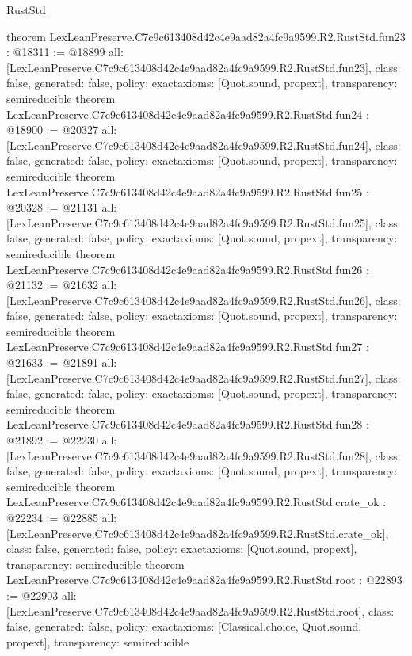 \begin{lexlean}{RustStd}
\begin{coremodule}
{}
theorem LexLeanPreserve.C7c9c613408d42c4e9aad82a4fc9a9599.R2.RustStd.fun23 : @18311 := @18899 {
  all: [LexLeanPreserve.C7c9c613408d42c4e9aad82a4fc9a9599.R2.RustStd.fun23],
  class: false,
  generated: false,
  policy: exact{axioms: [Quot.sound, propext]},
  transparency: semireducible
}
theorem LexLeanPreserve.C7c9c613408d42c4e9aad82a4fc9a9599.R2.RustStd.fun24 : @18900 := @20327 {
  all: [LexLeanPreserve.C7c9c613408d42c4e9aad82a4fc9a9599.R2.RustStd.fun24],
  class: false,
  generated: false,
  policy: exact{axioms: [Quot.sound, propext]},
  transparency: semireducible
}
theorem LexLeanPreserve.C7c9c613408d42c4e9aad82a4fc9a9599.R2.RustStd.fun25 : @20328 := @21131 {
  all: [LexLeanPreserve.C7c9c613408d42c4e9aad82a4fc9a9599.R2.RustStd.fun25],
  class: false,
  generated: false,
  policy: exact{axioms: [Quot.sound, propext]},
  transparency: semireducible
}
theorem LexLeanPreserve.C7c9c613408d42c4e9aad82a4fc9a9599.R2.RustStd.fun26 : @21132 := @21632 {
  all: [LexLeanPreserve.C7c9c613408d42c4e9aad82a4fc9a9599.R2.RustStd.fun26],
  class: false,
  generated: false,
  policy: exact{axioms: [Quot.sound, propext]},
  transparency: semireducible
}
theorem LexLeanPreserve.C7c9c613408d42c4e9aad82a4fc9a9599.R2.RustStd.fun27 : @21633 := @21891 {
  all: [LexLeanPreserve.C7c9c613408d42c4e9aad82a4fc9a9599.R2.RustStd.fun27],
  class: false,
  generated: false,
  policy: exact{axioms: [Quot.sound, propext]},
  transparency: semireducible
}
theorem LexLeanPreserve.C7c9c613408d42c4e9aad82a4fc9a9599.R2.RustStd.fun28 : @21892 := @22230 {
  all: [LexLeanPreserve.C7c9c613408d42c4e9aad82a4fc9a9599.R2.RustStd.fun28],
  class: false,
  generated: false,
  policy: exact{axioms: [Quot.sound, propext]},
  transparency: semireducible
}
theorem LexLeanPreserve.C7c9c613408d42c4e9aad82a4fc9a9599.R2.RustStd.crate_ok : @22234 := @22885 {
  all: [LexLeanPreserve.C7c9c613408d42c4e9aad82a4fc9a9599.R2.RustStd.crate_ok],
  class: false,
  generated: false,
  policy: exact{axioms: [Quot.sound, propext]},
  transparency: semireducible
}
theorem LexLeanPreserve.C7c9c613408d42c4e9aad82a4fc9a9599.R2.RustStd.root : @22893 := @22903 {
  all: [LexLeanPreserve.C7c9c613408d42c4e9aad82a4fc9a9599.R2.RustStd.root],
  class: false,
  generated: false,
  policy: exact{axioms: [Classical.choice, Quot.sound, propext]},
  transparency: semireducible
}


\end{coremodule}
\end{lexlean}

